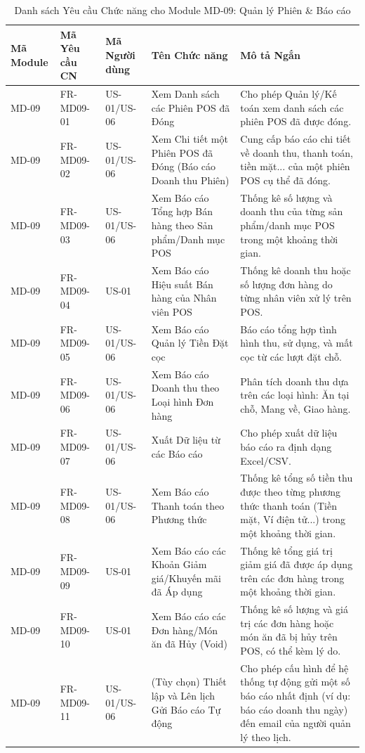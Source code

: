 \begin{longtable}{|m{2cm}|m{2.5cm}|m{2cm}|m{4.5cm}|m{4cm}|}
\caption{Danh sách Yêu cầu Chức năng cho Module MD-09: Quản lý Phiên \& Báo cáo} \label{tab:fr_md09_revised_v2} \\
\hline
\textbf{Mã Module} & \textbf{Mã Yêu cầu CN} & \textbf{Mã Người dùng} & \textbf{Tên Chức năng} & \textbf{Mô tả Ngắn} \\
\hline
\endhead %
\hline
\endfoot %
\hline
\endlastfoot %

MD-09 & FR-MD09-01 & US-01/US-06 & Xem Danh sách các Phiên POS đã Đóng & Cho phép Quản lý/Kế toán xem danh sách các phiên POS đã được đóng. \\
\hline
MD-09 & FR-MD09-02 & US-01/US-06 & Xem Chi tiết một Phiên POS đã Đóng (Báo cáo Doanh thu Phiên) & Cung cấp báo cáo chi tiết về doanh thu, thanh toán, tiền mặt... của một phiên POS cụ thể đã đóng. \\
\hline
MD-09 & FR-MD09-03 & US-01/US-06 & Xem Báo cáo Tổng hợp Bán hàng theo Sản phẩm/Danh mục POS & Thống kê số lượng và doanh thu của từng sản phẩm/danh mục POS trong một khoảng thời gian. \\
\hline
MD-09 & FR-MD09-04 & US-01 & Xem Báo cáo Hiệu suất Bán hàng của Nhân viên POS & Thống kê doanh thu hoặc số lượng đơn hàng do từng nhân viên xử lý trên POS. \\
\hline
MD-09 & FR-MD09-05 & US-01/US-06 & Xem Báo cáo Quản lý Tiền Đặt cọc & Báo cáo tổng hợp tình hình thu, sử dụng, và mất cọc từ các lượt đặt chỗ. \\
\hline
MD-09 & FR-MD09-06 & US-01/US-06 & Xem Báo cáo Doanh thu theo Loại hình Đơn hàng & Phân tích doanh thu dựa trên các loại hình: Ăn tại chỗ, Mang về, Giao hàng. \\
\hline
MD-09 & FR-MD09-07 & US-01/US-06 & Xuất Dữ liệu từ các Báo cáo & Cho phép xuất dữ liệu báo cáo ra định dạng Excel/CSV. \\
\hline
MD-09 & FR-MD09-08 & US-01/US-06 & Xem Báo cáo Thanh toán theo Phương thức & Thống kê tổng số tiền thu được theo từng phương thức thanh toán (Tiền mặt, Ví điện tử...) trong một khoảng thời gian. \\
\hline
MD-09 & FR-MD09-09 & US-01 & Xem Báo cáo các Khoản Giảm giá/Khuyến mãi đã Áp dụng & Thống kê tổng giá trị giảm giá đã được áp dụng trên các đơn hàng trong một khoảng thời gian. \\
\hline
MD-09 & FR-MD09-10 & US-01 & Xem Báo cáo các Đơn hàng/Món ăn đã Hủy (Void) & Thống kê số lượng và giá trị các đơn hàng hoặc món ăn đã bị hủy trên POS, có thể kèm lý do. \\
\hline
MD-09 & FR-MD09-11 & US-01/US-06 & (Tùy chọn) Thiết lập và Lên lịch Gửi Báo cáo Tự động & Cho phép cấu hình để hệ thống tự động gửi một số báo cáo nhất định (ví dụ: báo cáo doanh thu ngày) đến email của người quản lý theo lịch. \\
\hline

\end{longtable}


